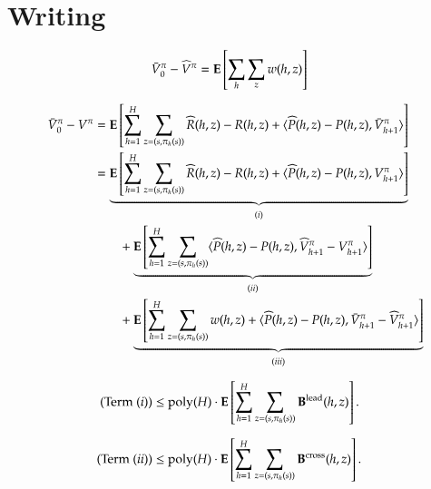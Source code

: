 
\section{Writing}
\newcommand{\Vbar}{\bar{V}}
\newcommand{\Qbar}{\bar{Q}}
\newcommand{\Pbar}{\bar{P}}

\newcommand{\blead}{\mathbf{B}^{\mathrm{lead}}}
\newcommand{\bcross}{\mathbf{B}^{\mathrm{cross}}}

\newcommand{\Vtil}{\tilde{V}}
\newcommand{\Qtil}{\tilde{Q}}
\newcommand{\Rtil}{\tilde{R}}

\newcommand{\Vhat}{\widehat{V}}
\newcommand{\Qhat}{\widehat{Q}}
\newcommand{\Phat}{\widehat{P}}
\newcommand{\Rhat}{\widehat{R}}

\newcommand{\Ehat}{\widehat{\Exp}}

\begin{align*}
\Vbar_0^{\pi} - \Vhat^{\pi} &=\Exp\left[\sum_h \sum_{z} w(h,z)\right] 
\end{align*}

\begin{align*}
\Vbar_0^{\pi} - V^\pi &= \Exp\left[\sum_{h=1}^H\sum_{z = (s,\pi_h(s))}  \Rhat(h,z) - R(h,z) +  \langle \Phat(h,z) - P(h,z), \Vbar^{\pi}_{h+1}\rangle \right]\\
&= \underbrace{\Exp\left[\sum_{h=1}^H\sum_{z = (s,\pi_h(s))}  \Rhat(h,z) - R(h,z) + \langle \Phat(h,z) - P(h,z),  V^{\pi}_{h+1}\rangle \right]}_{(i)}\\
&\qquad+ \underbrace{\Exp\left[\sum_{h=1}^H\sum_{z = (s,\pi_h(s))}  \langle \Phat(h,z) - P(h,z), \Vhat^{\pi}_{h+1} - V^{\pi}_{h+1}\rangle \right]}_{(ii)}\\
&\qquad+ \underbrace{\Exp\left[\sum_{h=1}^H\sum_{z = (s,\pi_h(s))} w(h,z) + \langle \Phat(h,z) - P(h,z), \Vbar^{\pi}_{h+1} - \Vhat^{\pi}_{h+1}\rangle \right]}_{(iii)}\\
\end{align*}
\begin{lemma}
\begin{align*}
&\text{\normalfont (Term $(i)$)} \le \mathrm{poly}(H)\cdot\Exp\left[\sum_{h=1}^H\sum_{z = (s,\pi_h(s))} \blead(h,z) \right].
\end{align*}
\end{lemma}
\begin{lemma}
\begin{align*}
&\text{\normalfont (Term $(ii)$)} \le \mathrm{poly}(H)\cdot\Exp\left[\sum_{h=1}^H\sum_{z = (s,\pi_h(s))} \bcross(h,z) \right].
\end{align*}
\end{lemma}


